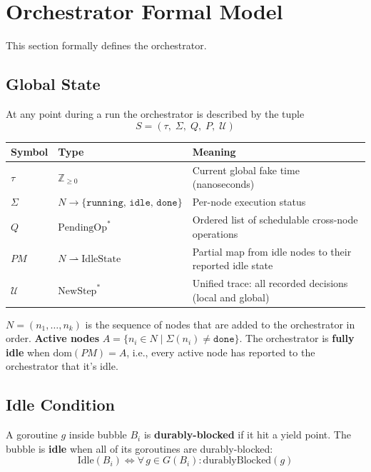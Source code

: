 \documentclass[11pt]{article}
\begin{document}
\section{Orchestrator Formal Model}

This section formally defines the orchestrator. 

\subsection{Global State}

At any point during a run the orchestrator is described by the tuple
\[
S = (\tau,\; \Sigma,\; Q,\; P,\; \mathcal{U})
\]

\begin{center}
\begin{tabular}{@{}lll@{}}
\toprule
Symbol & Type & Meaning \\
\midrule
$\tau$ & $\mathbb{Z}_{\geq 0}$ & Current global fake time (nanoseconds) \\
$\Sigma$ & $N \to \{\texttt{running},\, \texttt{idle},\, \texttt{done}\}$ & Per-node execution status \\
$Q$ & $\text{PendingOp}^*$ & Ordered list of schedulable cross-node operations \\
$PM$ & $N \rightharpoonup \text{IdleState}$ & Partial map from idle nodes to their reported idle state \\
$\mathcal{U}$ & $\text{NewStep}^*$ & Unified trace: all recorded decisions (local and global) \\
\bottomrule
\end{tabular}
\end{center}

$N = (n_1, \ldots, n_k)$ is the sequence of nodes that are added to the orchestrator in order. \textbf{Active nodes} $A = \{n_i \in N \mid \Sigma(n_i) \neq \texttt{done}\}$. The orchestrator is \textbf{fully idle} when $\mathrm{dom}(PM) = A$, i.e., every active node has reported to the orchestrator that it's idle.

\subsection{Idle Condition}

A goroutine $g$ inside bubble $B_i$ is \textbf{durably-blocked} if it hit a yield point. The bubble is \textbf{idle} when all of its goroutines are durably-blocked:
\[
\text{Idle}(B_i) \iff \forall\, g \in G(B_i) : \text{durablyBlocked}(g)
\]
\end{document}
